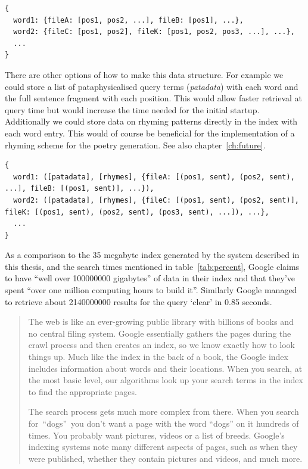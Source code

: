 \begin{verbatim}
{
  word1: {fileA: [pos1, pos2, ...], fileB: [pos1], ...},
  word2: {fileC: [pos1, pos2], fileK: [pos1, pos2, pos3, ...], ...},
  ...
}
\end{verbatim}

There are other options of how to make this data structure. For example we could store a list of pataphysicalised query terms (\emph{patadata}) with each word and the full sentence fragment with each position. This would allow faster retrieval at query time but would increase the time needed for the initial startup. Additionally we could store data on rhyming patterns directly in the index with each word entry. This would of course be beneficial for the implementation of a rhyming scheme for the poetry generation. See also chapter~\ref{ch:future}.

\begin{verbatim}
{
  word1: ([patadata], [rhymes], {fileA: [(pos1, sent), (pos2, sent), ...], fileB: [(pos1, sent)], ...}),
  word2: ([patadata], [rhymes], {fileC: [(pos1, sent), (pos2, sent)], fileK: [(pos1, sent), (pos2, sent), (pos3, sent), ...]), ...},
  ...
}
\end{verbatim}

\spirals

As a comparison to the \num{35} megabyte index generated by the system described in this thesis, and the search times mentioned in table~\ref{tab:percent}, Google claims to have ``well over \num{100000000} gigabytes'' of data in their index and that they've spent ``over one million computing hours to build it''. Similarly Google managed to retrieve about \num{2140000000} results for the query `clear' in 0.85 seconds.

\begin{quotation}
  The web is like an ever-growing public library with billions of books and no central filing system. Google essentially gathers the pages during the crawl process and then creates an index, so we know exactly how to look things up. Much like the index in the back of a book, the Google index includes information about words and their locations. When you search, at the most basic level, our algorithms look up your search terms in the index to find the appropriate pages.

  The search process gets much more complex from there. When you search for ``dogs'' you don't want a page with the word ``dogs'' on it hundreds of times. You probably want pictures, videos or a list of breeds. Google's indexing systems note many different aspects of pages, such as when they were published, whether they contain pictures and videos, and much more.
\end{quotation}

